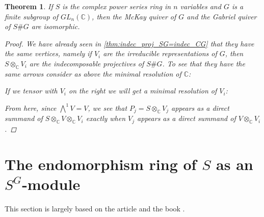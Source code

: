 \documentclass[11pt, a4paper, english]{article}
\newtheorem{theorem}{Theorem}[section]
\theoremstyle{definition}
\newcommand{\C}{\mathbb{C}}
\begin{document}
\begin{theorem}
\label{thm:gabriel_equals_mckay}
If $S$ is the complex power series ring in $n$ variables and $G$ is a finite subgroup of $GL_n(\C)$, then the McKay quiver of $G$ and the Gabriel quiver of $S\#G$ are isomorphic.
\begin{proof}
We have already seen in \cref{thm:indec_proj_SG=indec_CG} that they have the same vertices, namely if $V_i$ are the irreducible representations of $G$, then $S \otimes_\C V_i$ are the indecomposable projectives of $S\#G$. To see that they have the same arrows consider as above the minimal resolution of $\C$:
\begin{center}
\end{center}
If we tensor with $V_i$ on the right we will get a minimal resolution of $V_i$:
\begin{center}
\end{center}
From here, since $\bigwedge\limits^{1} V = V$, we see that $P_j = S \otimes_\C V_j$ appears as a direct summand of $S \otimes_\C V \otimes_\C V_i$ exactly when $V_j$ appears as a direct summand of $V \otimes_\C V_i$.
\end{proof}
\end{theorem}

\section{The endomorphism ring of $S$ as an $S^G$-module}
This section is largely based on the article \cite{IyTa} and the book \cite{CMR}.
\end{document}
